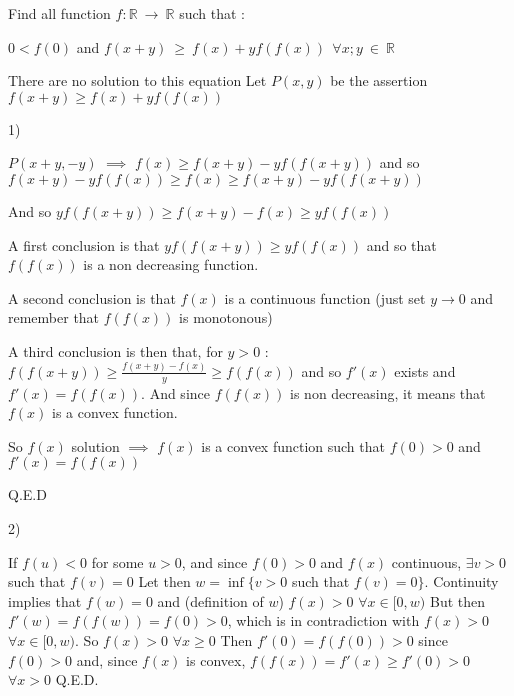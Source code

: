 \begin{solution}
	\begin{tcolorbox}\begin{italicized}Find all function $ f : \mathbb{R} \ \to \ \mathbb{R}$  such that  :

   $ 0 < f(0)$ and $ f(x + y) \ \geq \ f(x) + yf(f(x)) \ \ \forall x; y \ \in \ \mathbb{R}$\end{italicized}\end{tcolorbox}
There are no solution to this equation
Let $ P(x,y)$ be the assertion $ f(x+y)\geq f(x)+yf(f(x))$

1) 

$ P(x+y,-y)$ $ \implies$ $ f(x)\geq f(x+y)-yf(f(x+y))$ and so $ f(x+y)-yf(f(x))\geq f(x)\geq f(x+y)-yf(f(x+y))$

And so $ yf(f(x+y))\geq f(x+y)-f(x)\geq yf(f(x))$

A first conclusion is that $ yf(f(x+y))\geq yf(f(x))$ and so that $ f(f(x))$ is a non decreasing function.

A second conclusion is that $ f(x)$ is a continuous function (just set $ y\to 0$ and remember that $ f(f(x))$ is monotonous)

A third conclusion is then that, for $ y>0$ : $ f(f(x+y))\geq \frac{f(x+y)-f(x)}y\geq f(f(x))$ and so $ f'(x)$ exists and $ f'(x)=f(f(x))$. And since $ f(f(x))$ is non decreasing, it means that $ f(x)$ is a convex function.

So $ f(x)$ solution $ \implies$ $ f(x)$ is a convex function such that $ f(0)>0$ and $ f'(x)=f(f(x))$

Q.E.D

2)
If $ f(u)<0$ for some $ u>0$, and since $ f(0)>0$ and $ f(x)$ continuous, $ \exists v>0$ such that $ f(v)=0$
Let then $ w=\inf\{v>0$ such that $ f(v)=0\}$. Continuity implies that $ f(w)=0$ and (definition of $ w$) $ f(x)>0$ $ \forall x\in[0,w)$
But then $ f'(w)=f(f(w))=f(0)>0$, which is in contradiction with $ f(x)>0$ $ \forall x\in[0,w)$.
So $ f(x)>0$ $ \forall x\geq 0$
Then $ f'(0)=f(f(0))>0$ since $ f(0)>0$ and, since $ f(x)$ is convex, $ f(f(x))=f'(x)\geq f'(0)>0$ $ \forall x>0$
Q.E.D.


\end{solution}
